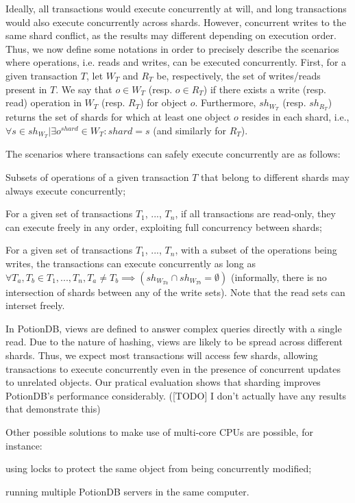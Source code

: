 \documentclass{vldb}
\begin{document}
Ideally, all transactions would execute concurrently at will, and long transactions would also execute concurrently across shards.
However, concurrent writes to the same shard conflict, as the results may different depending on execution order.
Thus, we now define some notations in order to precisely describe the scenarios where operations, i.e. reads and writes, can be executed concurrently.
First, for a given transaction $T$, let $W_T$ and $R_T$ be, respectively, the set of writes/reads present in $T$.
We say that $o \in W_T$ (resp. $o \in R_T$) if there exists a write (resp. read) operation in $W_T$ (resp. $R_T$) for object $o$.
Furthermore, $sh_{W_T}$ (resp. $sh_{R_T}$) returns the set of shards for which at least one object $o$ resides in each shard, i.e., $\forall s \in sh_{W_T} | \exists o^{shard} \in W_T : shard = s$ (and similarly for $R_T$).

The scenarios where transactions can safely execute concurrently are as follows:

\begin{compactitem}
	\item Subsets of operations of a given transaction $T$ that belong to different shards may always execute concurrently;
	\item For a given set of transactions $T_1$, ..., $T_n$, if all transactions are read-only, they can execute freely in any order, exploiting full concurrency between shards;
	\item For a given set of transactions $T_1$, ..., $T_n$, with a subset of the operations being writes, the transactions can execute concurrently as long as $\forall T_a, T_b \in T_1, ..., T_n, T_a \neq T_b \implies (sh_{W_{Ta}} \cap sh_{W_{Tb}} = \emptyset)$ (informally, there is no intersection of shards between any of the write sets). Note that the read sets can interset freely.
\end{compactitem}

In PotionDB, views are defined to answer complex queries directly with a single read.
Due to the nature of hashing, views are likely to be spread across different shards.
Thus, we expect most transactions will access few shards, allowing transactions to execute concurrently even in the presence of concurrent updates to unrelated objects. Our pratical evaluation shows that sharding improves PotionDB's performance considerably.
([TODO] I don't actually have any results that demonstrate this)

Other possible solutions to make use of multi-core CPUs are possible, for instance:
\begin{compactenum}
	\item \label{item:locks} using locks to protect the same object from being concurrently modified;
	\item \label{item:multiplePotion} running multiple PotionDB servers in the same computer.
\end{compactenum}
\end{document}
